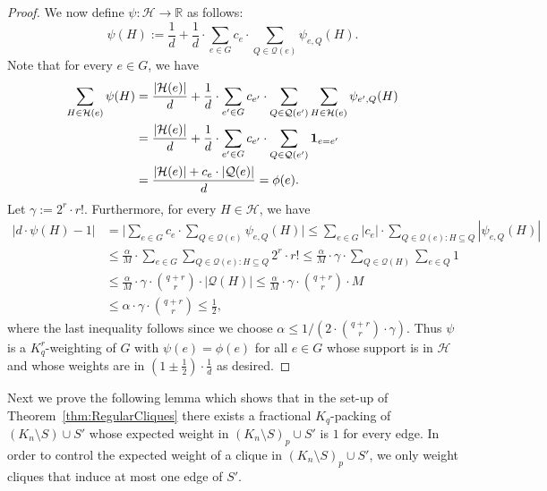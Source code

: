 \documentclass[11pt]{article}
\numberwithin{equation}{section}
\newcommand{\mc}[1]{\mathcal{#1}}
\newcounter{i}
\theoremstyle{plain}
\theoremstyle{plain} %
\theoremstyle{definition}
\begin{document}
\begin{proof}
We now define $\psi: \mc{H}\rightarrow \mathbb{R}$ as follows:
$$\psi(H):= \frac{1}{d} + \frac{1}{d} \cdot \sum_{e\in G} c_e \cdot \sum_{Q\in \mc{Q}(e)} \psi_{e,Q}(H).$$
Note that for every $e\in G$, we have
\begin{align*}\sum_{H\in \mc{H}(e)} \psi(H) &= \frac{|\mc{H}(e)|}{d} + \frac{1}{d}\cdot \sum_{e'\in G}c_{e'} \cdot \sum_{Q\in \mc{Q}(e')} \sum_{H\in \mc{H}(e)} \psi_{e',Q}(H)\\
&= \frac{|\mc{H}(e)|}{d} + \frac{1}{d}\cdot  \sum_{e'\in G}c_{e'} \cdot \sum_{Q\in \mc{Q}(e')} {\bf 1}_{e=e'}\\
&= \frac{|\mc{H}(e)| + c_{e} \cdot |\mc{Q}(e)|}{d} = \phi(e).\\
\end{align*}
Let $\gamma:= 2^r\cdot r!$. Furthermore, for every $H\in \mc{H}$, we have 
\begin{align*}
\bigg|d\cdot \psi(H)-1\bigg| &= \bigg|\sum_{e\in G} c_e\cdot \sum_{Q\in \mc{Q}(e)} \psi_{e,Q}(H)\bigg| \le \sum_{e\in G} |c_e|\cdot \sum_{Q\in \mc{Q}(e): H\subseteq Q} |\psi_{e,Q}(H)| \\ 
&\le \frac{\alpha}{M} \cdot \sum_{e\in G}  \sum_{Q\in \mc{Q}(e): H\subseteq Q} 2^r\cdot r! \le \frac{\alpha}{M} \cdot \gamma \cdot \sum_{Q\in \mc{Q}(H)} \sum_{e\in Q} 1\\
&\le \frac{\alpha}{M} \cdot \gamma \cdot \binom{q+r}{r} \cdot |\mc{Q}(H)| \le \frac{\alpha}{M} \cdot \gamma \cdot \binom{q+r}{r} \cdot M \\
&\le \alpha \cdot \gamma \cdot \binom{q+r}{r} \le \frac{1}{2},
\end{align*}
where the last inequality follows since we choose $\alpha \le {1}/({2\cdot \binom{q+r}{r}\cdot \gamma})$. Thus $\psi$ is a $K_q^r$-weighting of $G$ with $\psi(e)=\phi(e)$ for all $e\in G$ whose support is in $\mc{H}$ and whose weights are in $\left(1\pm \frac{1}{2}\right) \cdot \frac{1}{d}$ as desired.
\end{proof}

Next we prove the following lemma which shows that in the set-up of Theorem~\ref{thm:RegularCliques} there exists a fractional $K_q$-packing of $(K_n\setminus S)\cup S'$ whose expected weight in $(K_n\setminus S)_p\cup S'$ is $1$ for every edge. 
In order to control the expected weight of a clique in $(K_n\setminus S)_p\cup S'$, we only weight cliques that induce at most one edge of $S'$.
\end{document}
